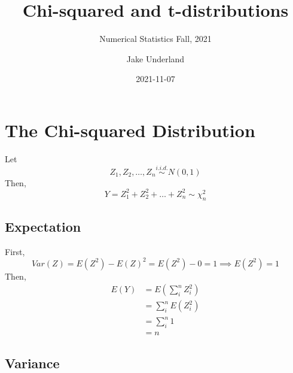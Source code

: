 \documentclass[
]{article}
\title{Chi-squared and t-distributions}
\subtitle{Numerical Statistics Fall, 2021}
\author{Jake Underland}
\date{2021-11-07}
\begin{document}
\maketitle

{
\setcounter{tocdepth}{3}
\tableofcontents
}
\hypertarget{the-chi-squared-distribution}{%
\section{The Chi-squared
Distribution}\label{the-chi-squared-distribution}}

Let \[Z_1, Z_2, \dots, Z_n \stackrel{i.i.d.}{\sim}N(0, 1)\] Then,
\[Y = Z_1^2 + Z_2^2 + \dots + Z_n^2 \sim \chi_n^2\]

\hypertarget{expectation}{%
\subsection{Expectation}\label{expectation}}

First, \[Var(Z) = E(Z^2) - E(Z)^2 = E(Z^2) - 0 = 1\implies E(Z^2) = 1\]
Then, \[\begin{aligned}
E(Y) &= E(\sum_i^n Z_i^2) \\
&= \sum_i^n E(Z_i^2) \\
&= \sum_i^n 1 \\
&= n
\end{aligned}\]

\hypertarget{variance}{%
\subsection{Variance}\label{variance}}
\end{document}
